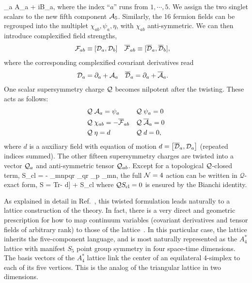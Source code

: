 \beq
  \label{5dgauge}
  \cA_a \equiv A_a + iB_a,
\eeq
where the index ``$a$'' runs from $1, \cdots, 5$.
We assign the two singlet scalars to the new fifth component $\mathcal A_5$.
Similarly, the 16 fermion fields can be regrouped into the multiplet $\chi_{ab}, \psi_a, \eta$, with $\chi_{ab}$ anti-symmetric.
We can then introduce complexified field strengths,
\begin{align}
  {\cal F}_{ab} & \equiv [\mathcal D_a, \mathcal D_b] &
  {\overline{\cal F}}_{ab} & \equiv [{\overline{\cal D}}_a, {\overline{\cal D}}_b],
\end{align}
where the corresponding complexified covariant derivatives read
\begin{align}
  \mathcal D_a & = \partial_a + \mathcal A_a &
  {\overline{\cal D}}_a & = \partial_a + \overline{\mathcal A}_a.
\end{align}
One scalar supersymmetry charge $\mathcal Q$ becomes nilpotent after the twisting.
These acts as follows:
\begin{align}
  & \mathcal Q\; \mathcal A_a = \psi_a         & & \mathcal Q\; \psi_a = 0                       \cr
  & \mathcal Q\; \chi_{ab} = -{\overline{\cal F}}_{ab} & & \mathcal Q\; \overline{\mathcal A}_a = 0 \label{BRSTsymmetry}  \\
  & \mathcal Q\; \eta = d               & & \mathcal Q\; d = 0,                           \nonumber
\end{align}
where $d$ is a auxiliary field with equation of motion $d = \left[{\overline{\cal D}}_a, \mathcal D_a\right]$ (repeated indices summed).
The other fifteen supersymmetry charges are twisted into a vector $\mathcal Q_a$ and anti-symmetric tensor $\mathcal Q_{ab}$.
Except for a topological $\mathcal Q$-closed term,
\beq
  \label{closed}
  S_{\rm cl} = - \int \Tr \epsilon_{mnpqr} \chi_{qr} \cDb_p \chi_{mn},
\eeq
the full $\mathcal N = 4$ action can be written in $\mathcal{Q}$-exact form, 
\beq
  \label{4daction}
  S =  \cQ \int \mbox{Tr}\left[\chi_{ab}\cF_{ab} + \eta [ \cDb_a,\cD_a ] - \eta d\right] + S_{\rm cl}
\eeq
where $\mathcal{Q} S_{\rm cl} = 0$ is ensured by the Bianchi identity.

As explained in detail in Ref.~\cite{Catterall:2007kn}, this twisted formulation leads naturally to a lattice construction of the theory.
In fact, there is a very direct and geometric prescription for how to map continuum variables 
(covariant derivatives and tensor fields of arbitrary rank) to those of the 
lattice~\cite{Catterall:2007kn, Damgaard:2008pa}.
In this particular case, the lattice inherits the five-component language, and is most 
naturally represented as the $A_4^*$ lattice with manifest $S_5$ point group symmetry 
in four space-time dimensions.
The basis vectors of the $A_4^*$ lattice link the center of an equilateral 4-simplex to each of its five vertices.
This is the analog of the triangular lattice in two dimensions. 

